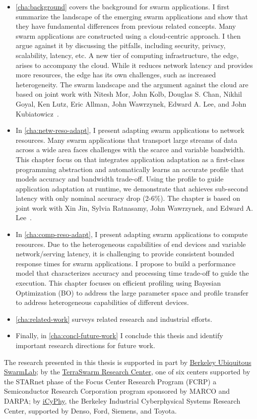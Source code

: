 \documentclass[thesis.tex]{subfiles}
\begin{document}
\begin{itemize}[topsep=5pt, leftmargin=15pt]
\item \autoref{cha:background} covers the background for swarm applications. I
  first summarize the landscape of the emerging swarm applications and show that
  they have fundamental differences from previous related concepts.  Many swarm
  applications are constructed using a cloud-centric approach. I then argue
  against it by discussing the pitfalls, including security, privacy,
  scalability, latency, etc. A new tier of computing infrastructure, the edge,
  arises to accompany the cloud. While it reduces network latency and provides
  more resources, the edge has its own challenges, such as increased
  heterogeneity. The swarm landscape and the argument against the cloud are
  based on joint work with Nitesh Mor, John Kolb, Douglas S. Chan, Nikhil Goyal,
  Ken Lutz, Eric Allman, John Wawrzynek, Edward A. Lee, and John
  Kubiatowicz~\cite{zhang2015cloud}.
\item In \autoref{cha:netw-reso-adapt}, I present adapting swarm applications to
  network resources. Many swarm applications that transport large streams of
  data across a wide area faces challenges with the scarce and variable
  bandwidth. This chapter focus on \awstream{} that integrates application
  adaptation as a first-class programming abstraction and automatically learns
  an accurate profile that models accuracy and bandwidth trade-off. Using the
  profile to guide application adaptation at runtime, we demonstrate that
  \awstream{} achieves sub-second latency with only nominal accuracy drop
  (2-6\%).  The chapter is based on joint work with Xin Jin, Sylvia Ratnasamy,
  John Wawrzynek, and Edward A. Lee~\cite{zhang2018awstream}.
\item In \autoref{cha:comp-reso-adapt}, I present adapting swarm applications to
  compute resources. Due to the heterogeneous capabilities of end devices and
  variable network/serving latency, it is challenging to provide consistent
  bounded response times for swarm applications. I propose to build a
  performance model that characterizes accuracy and processing time trade-off to
  guide the execution. This chapter focuses on efficient profiling using
  Bayesian Optimization (BO) to address the large parameter space and profile
  transfer to address heterogeneous capabilities of different devices.
\item \autoref{cha:related-work} surveys related research and industrial
  efforts.
\item Finally, in \autoref{cha:concl-future-work} I conclude this thesis and
  identify important research directions for future work.
\end{itemize}

The research presented in this thesis is supported in part by
\href{https://swarmlab.berkeley.edu/}{Berkeley Ubiquitous SwarmLab}; by the
\href{https://terraswarm.org/}{TerraSwarm Research Center}, one of six centers
supported by the STARnet phase of the Focus Center Research Program (FCRP) a
Semiconductor Research Corporation program sponsored by MARCO and DARPA; by
\href{https://www.icyphy.org/}{iCyPhy}, the Berkeley Industrial Cyberphysical
Systems Research Center, supported by Denso, Ford, Siemens, and Toyota.
\end{document}
